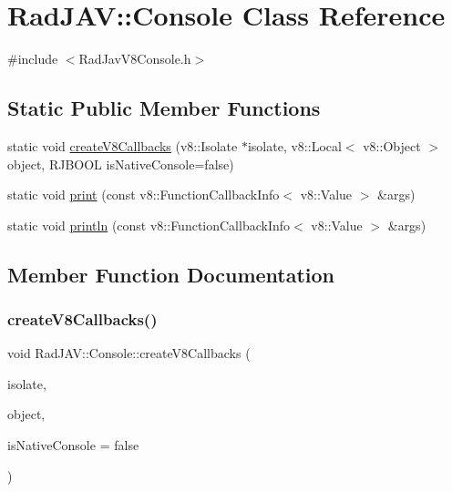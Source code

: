 \hypertarget{class_rad_j_a_v_1_1_console}{}\section{Rad\+J\+AV\+:\+:Console Class Reference}
\label{class_rad_j_a_v_1_1_console}


{\ttfamily \#include $<$Rad\+Jav\+V8\+Console.\+h$>$}

\subsection*{Static Public Member Functions}
\begin{DoxyCompactItemize}
\item 
static void \mbox{\hyperlink{class_rad_j_a_v_1_1_console_a7d04641b81326f254d75cbb4a382c1a0}{create\+V8\+Callbacks}} (v8\+::\+Isolate $\ast$isolate, v8\+::\+Local$<$ v8\+::\+Object $>$ object, R\+J\+B\+O\+OL is\+Native\+Console=false)
\item 
static void \mbox{\hyperlink{class_rad_j_a_v_1_1_console_a1490b3b429e5d0d404102cbb8a577627}{print}} (const v8\+::\+Function\+Callback\+Info$<$ v8\+::\+Value $>$ \&args)
\item 
static void \mbox{\hyperlink{class_rad_j_a_v_1_1_console_a33eaa75ff2eb8009c31e5b1f04ba5e80}{println}} (const v8\+::\+Function\+Callback\+Info$<$ v8\+::\+Value $>$ \&args)
\end{DoxyCompactItemize}


\subsection{Member Function Documentation}
\mbox{\label{class_rad_j_a_v_1_1_console_a7d04641b81326f254d75cbb4a382c1a0}} 
\subsubsection{\texorpdfstring{create\+V8\+Callbacks()}{createV8Callbacks()}}
{\footnotesize\ttfamily void Rad\+J\+A\+V\+::\+Console\+::create\+V8\+Callbacks (\begin{DoxyParamCaption}\item[{v8\+::\+Isolate $\ast$}]{isolate,  }\item[{v8\+::\+Local$<$ v8\+::\+Object $>$}]{object,  }\item[{R\+J\+B\+O\+OL}]{is\+Native\+Console = {\ttfamily false} }\end{DoxyParamCaption})\hspace{0.3cm}{\ttfamily [static]}}

